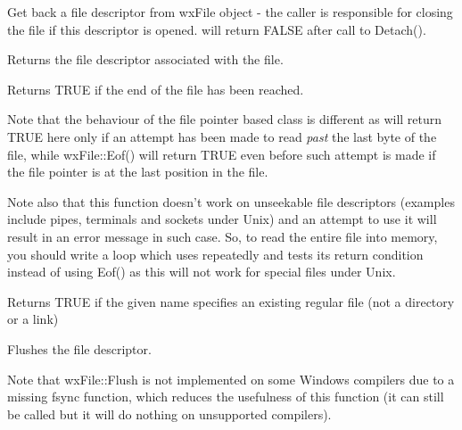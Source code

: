 
Get back a file descriptor from wxFile object - the caller is responsible for closing the file if this
descriptor is opened.  will return FALSE after call to Detach().

\label{wxfilefd}


Returns the file descriptor associated with the file.

\label{wxfileeof}


Returns TRUE if the end of the file has been reached.

Note that the behaviour of the file pointer based class 
 is different as  
will return TRUE here only if an attempt has been made to read 
{\it past} the last byte of the file, while wxFile::Eof() will return TRUE
even before such attempt is made if the file pointer is at the last position
in the file.

Note also that this function doesn't work on unseekable file descriptors
(examples include pipes, terminals and sockets under Unix) and an attempt to
use it will result in an error message in such case. So, to read the entire
file into memory, you should write a loop which uses 
 repeatedly and tests its return condition instead
of using Eof() as this will not work for special files under Unix.

\label{wxfileexists}


Returns TRUE if the given name specifies an existing regular file (not a
directory or a link)

\label{wxfileflush}


Flushes the file descriptor.

Note that wxFile::Flush is not implemented on some Windows compilers
due to a missing fsync function, which reduces the usefulness of this function
(it can still be called but it will do nothing on unsupported compilers).

\label{wxfileisopened}


